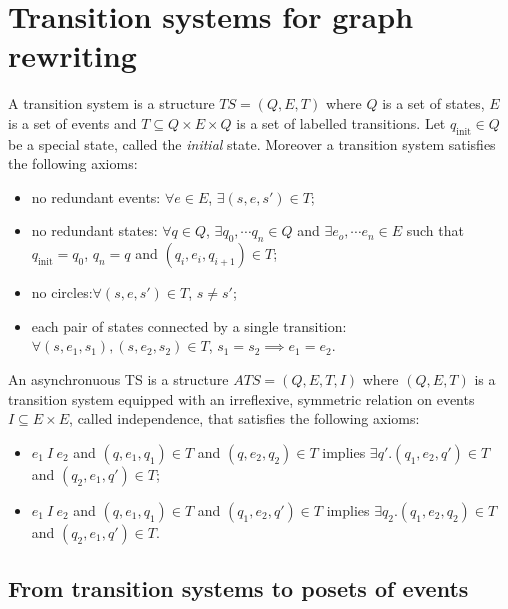 \section{Transition systems for graph rewriting}

\begin{definition}
  A transition system is a structure $TS = (Q,E,T)$ where $Q$ is a set of states, $E$ is a set of events and $T\subseteq Q\times E\times Q$ is a set of labelled transitions. Let $q_{\text{init}}\in Q$ be a special state, called the \emph{initial} state. Moreover a transition system satisfies the following axioms:
  \begin{itemize}
  \item no redundant events: $\forall e\in E$, $\exists (s,e,s')\in T$;
  \item no redundant states: $\forall q\in Q$, $\exists q_0,\cdots q_n \in Q$ and $\exists e_o,\cdots e_n\in E$ such that $q_{\text{init}} = q_0$, $q_n =q$ and $(q_i,e_i,q_{i+1}) \in T$;
  \item no circles:$\forall (s,e,s')\in T$, $s\neq s'$;
  \item each pair of states connected by a single transition: $\forall (s,e_1,s_1), (s,e_2,s_2)\in T$, $s_1=s_2\implies e_1=e_2$.
  \end{itemize}
\end{definition}

\begin{definition}
  An asynchronuous TS is a structure $ATS = (Q,E,T,I)$ where $(Q,E,T)$ is a transition system equipped with an irreflexive, symmetric relation on events $I\subseteq E\times E$, called independence, that satisfies the following axioms:
  \begin{itemize}
  \item $e_1~I~e_2$ and $(q,e_1,q_1)\in T$ and $(q,e_2,q_2)\in T$ implies $\exists q'.(q_1,e_2,q')\in T$ and $(q_2,e_1,q')\in T$;
  \item $e_1~I~e_2$ and $(q,e_1,q_1)\in T$ and $(q_1,e_2,q')\in T$ implies $\exists q_2.(q_1,e_2,q_2)\in T$ and $(q_2,e_1,q')\in T$.
  \end{itemize}
\end{definition}

\subsection{From transition systems to posets of events}

